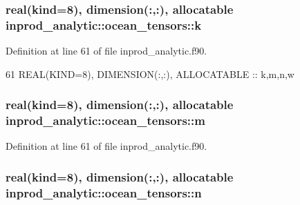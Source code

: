 \subsubsection[{\texorpdfstring{k}{k}}]{\setlength{\rightskip}{0pt plus 5cm}real(kind=8), dimension(\+:,\+:), allocatable inprod\+\_\+analytic\+::ocean\+\_\+tensors\+::k\hspace{0.3cm}{\ttfamily [private]}}\hypertarget{structinprod__analytic_1_1ocean__tensors_a1ab0d8f229b274e954a53cc1ce40cac1}{}\label{structinprod__analytic_1_1ocean__tensors_a1ab0d8f229b274e954a53cc1ce40cac1}


Definition at line 61 of file inprod\+\_\+analytic.\+f90.


\begin{DoxyCode}
61      \textcolor{keywordtype}{REAL(KIND=8)}, \textcolor{keywordtype}{DIMENSION(:,:)}, \textcolor{keywordtype}{ALLOCATABLE} :: k,m,n,w
\end{DoxyCode}
\subsubsection[{\texorpdfstring{m}{m}}]{\setlength{\rightskip}{0pt plus 5cm}real(kind=8), dimension(\+:,\+:), allocatable inprod\+\_\+analytic\+::ocean\+\_\+tensors\+::m\hspace{0.3cm}{\ttfamily [private]}}\hypertarget{structinprod__analytic_1_1ocean__tensors_a6f8f8b2b4ef239db0a9f751d7e8452e8}{}\label{structinprod__analytic_1_1ocean__tensors_a6f8f8b2b4ef239db0a9f751d7e8452e8}


Definition at line 61 of file inprod\+\_\+analytic.\+f90.

\subsubsection[{\texorpdfstring{n}{n}}]{\setlength{\rightskip}{0pt plus 5cm}real(kind=8), dimension(\+:,\+:), allocatable inprod\+\_\+analytic\+::ocean\+\_\+tensors\+::n\hspace{0.3cm}{\ttfamily [private]}}\hypertarget{structinprod__analytic_1_1ocean__tensors_a5087e225a596aee2d668f6282dd6a019}{}\label{structinprod__analytic_1_1ocean__tensors_a5087e225a596aee2d668f6282dd6a019}


